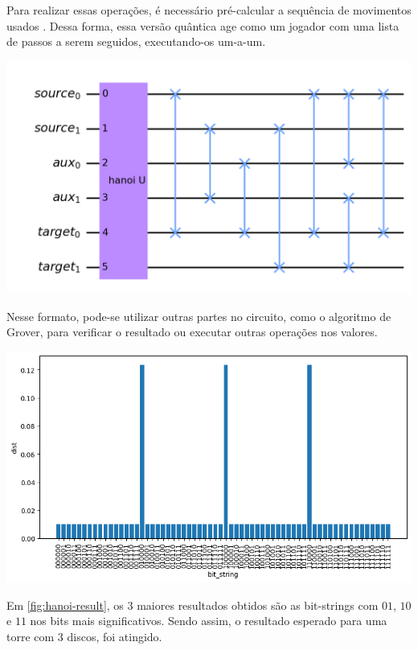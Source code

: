 \documentclass{article}
\begin{document}
Para realizar essas operações, é necessário pré-calcular a sequência de movimentos usados  \cite{ldiaandr_2021_tower} \cite{diptokarmakar47_2019_how} \cite{a2020_towers}  \cite{geeksforgeeks_2014_program}. Dessa forma, essa versão quântica age como um jogador com uma lista de passos a serem seguidos, executando-os um-a-um.

\begin{center}
	\includegraphics[scale=0.3]{hanoi_3_discs.png}
	\label{fig:hanoi}
\end{center}

Nesse formato, pode-se utilizar outras partes no circuito, como o algoritmo de Grover, para verificar o resultado ou executar outras operações nos valores.

\begin{center}
	\includegraphics[scale=0.5]{result_hanoi_3_discs.png}
	\label{fig:hanoi-result}
\end{center}

Em \ref{fig:hanoi-result}, os $3$ maiores resultados obtidos são as bit-strings com $01$, $10$ e $11$ nos bits mais significativos. Sendo assim, o resultado esperado para uma torre com 3 discos, foi atingido.
\end{document}
